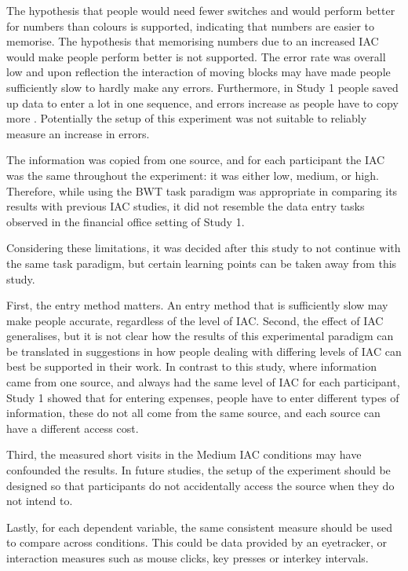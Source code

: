 \documentclass[11pt,oneside]{report}
\begin{document}
\begin{table}
The hypothesis that people would need fewer switches and would perform better for numbers than colours is supported, indicating that numbers are easier to memorise. The hypothesis that memorising numbers due to an increased IAC would make people perform better is not supported. The error rate was overall low and upon reflection the interaction of moving blocks may have made people sufficiently slow to hardly make any errors. Furthermore, in Study 1 people saved up data to enter a lot in one sequence, and errors increase as people have to copy more \citep{Healy2004}. Potentially the setup of this experiment was not suitable to reliably measure an increase in errors.
 
The information was copied from one source, and for each participant the IAC was the same throughout the experiment: it was either low, medium, or high. Therefore, while using the BWT task paradigm was appropriate in comparing its results with previous IAC studies, it did not resemble the data entry tasks observed in the financial office setting of Study 1. 

Considering these limitations, it was decided after this study to not continue with the same task paradigm, but certain learning points can be taken away from this study.  

First, the entry method matters. An entry method that is sufficiently slow may make people accurate, regardless of the level of IAC. 
Second, the effect of IAC generalises, but it is not clear how the results of this experimental paradigm can be translated in suggestions in how people dealing with differing levels of IAC can best be supported in their work. In contrast to this study, where information came from one source, and always had the same level of IAC for each participant, Study 1 showed that for entering expenses, people have to enter different types of information, these do not all come from the same source, and each source can have a different access cost.

Third, the measured short visits in the Medium IAC conditions may have confounded the results. In future studies, the setup of the experiment should be designed so that participants do not accidentally access the source when they do not intend to.

Lastly, for each dependent variable, the same consistent measure should be used to compare across conditions. This could be data provided by an eyetracker, or interaction measures such as mouse clicks, key presses or interkey intervals. 


\end{table}
\end{document}
